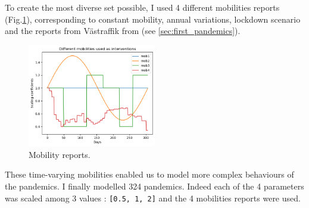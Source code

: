 To create the most diverse set possible, I used 4 different mobilities reports (Fig.\ref{fig:mobilities}), corresponding to constant mobility, annual variations, lockdown scenario and the reports from Västraffik from \cite{gerlee2021predicting} (see \ref{sec:first_pandemics}). 
\begin{figure}[h!]
    \centering
    \includegraphics[width=0.5\textwidth]{figures/mobilities.png}
    \caption{Mobility reports.}
    \label{fig:mobilities}
\end{figure}
These time-varying mobilities enabled us to model more complex behaviours of the pandemics. 
I finally modelled 324 pandemics. 
Indeed each of the 4 parameters was scaled among 3 values : \texttt{[0.5, 1, 2]} and the 4 mobilities reports were used.


